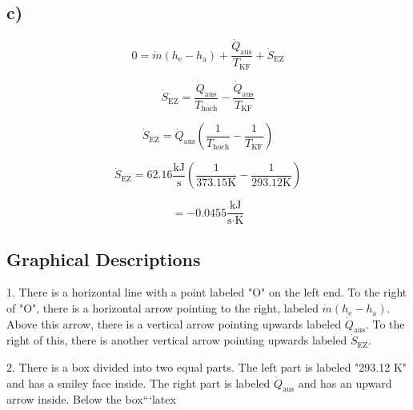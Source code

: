 

\subsection*{c)}

\[
0 = \dot{m} (h_{\text{e}} - h_{\text{a}}) + \frac{\dot{Q}_{\text{aus}}}{T_{\text{KF}}} + \dot{S}_{\text{EZ}}
\]

\[
\dot{S}_{\text{EZ}} = \frac{\dot{Q}_{\text{aus}}}{T_{\text{hoch}}} - \frac{\dot{Q}_{\text{aus}}}{T_{\text{KF}}}
\]

\[
\dot{S}_{\text{EZ}} = \dot{Q}_{\text{aus}} \left( \frac{1}{T_{\text{hoch}}} - \frac{1}{T_{\text{KF}}} \right)
\]

\[
\dot{S}_{\text{EZ}} = 62.16 \frac{\text{kJ}}{\text{s}} \left( \frac{1}{373.15 \text{K}} - \frac{1}{293.12 \text{K}} \right)
\]

\[
= -0.0455 \frac{\text{kJ}}{\text{s} \cdot \text{K}}
\]

\subsection*{Graphical Descriptions}

1. There is a horizontal line with a point labeled "O" on the left end. To the right of "O", there is a horizontal arrow pointing to the right, labeled $\dot{m} (h_{\text{e}} - h_{\text{a}})$. Above this arrow, there is a vertical arrow pointing upwards labeled $\dot{Q}_{\text{aus}}$. To the right of this, there is another vertical arrow pointing upwards labeled $\dot{S}_{\text{EZ}}$.

2. There is a box divided into two equal parts. The left part is labeled "293.12 K" and has a smiley face inside. The right part is labeled $\dot{Q}_{\text{aus}}$ and has an upward arrow inside. Below the box```latex